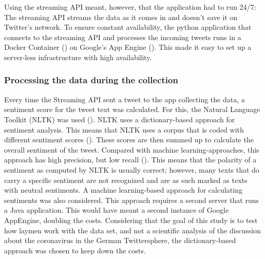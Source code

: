 Using the streaming API meant, however, that the application had to run 24/7: The streaming API streams the data as it comes in and doesn't save it on Twitter's network. To ensure constant availability, the python application that connects to the streaming API and processes the incoming tweets runs in a Docker Container (\cite{merkel2014docker}) on Google's App Engine (\cite{googleAppEngineApplication2020}). This made it easy to set up a server-less infrastructure with high availability.

\subsubsection{Processing the data during the collection}
Every time the Streaming API sent a tweet to the app collecting the data, a sentiment score for the tweet text was calculated. For this, the Natural Language Toolkit (NLTK) was used (\cite{loper2002nltk}). NLTK uses a dictionary-based approach for sentiment analysis. This means that NLTK uses a corpus that is coded with different sentiment scores (\cite{haselmayer2017sentiment}). These scores are then summed up to calculate the overall sentiment of the tweet.
Compared with machine learning-approaches, this approach has high precision, but low recall (\cite{sorokaBadNewsMad2015}). This means that the polarity of a sentiment as computed by NLTK is usually correct; however, many texts that do carry a specific sentiment are not recognized and are as such marked as texts with neutral sentiments.
A machine learning-based approach for calculating sentiments was also considered. This approach requires a second server that runs a Java application. This would have meant a second instance of Google AppEngine, doubling the costs. Considering that the goal of this study is to test how laymen work with the data set, and not a scientific analysis of the discussion about the coronavirus in the German Twittersphere, the dictionary-based approach was chosen to keep down the costs.


